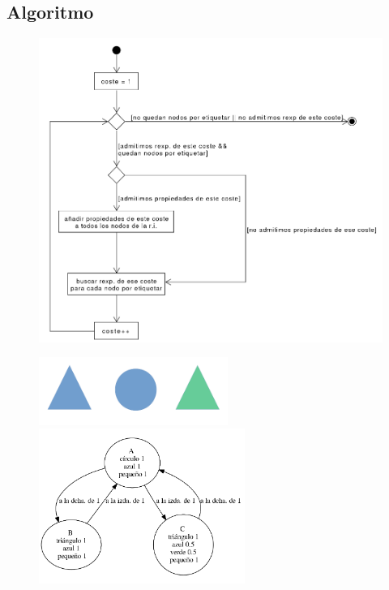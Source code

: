 \documentclass{beamer}
\begin{document}
	\subsection{Algoritmo}
	
	\begin{frame}
		\begin{figure}[H]
			\centering
			\includegraphics[scale=0.3]{img/diagramaFlujoAlgCrisp.png}
		\end{figure}
	\end{frame}
	
	\begin{frame}
		\begin{figure}[H]
			\centering
			\includegraphics[width=0.55\textwidth]{img/ejemploAlgoritmoNoDifuso.png}
			\includegraphics[width=0.6\textwidth]{img/riEjemploAlgoritmoNoDifuso.png}		
		\end{figure}		
	\end{frame}
	
\end{document}
